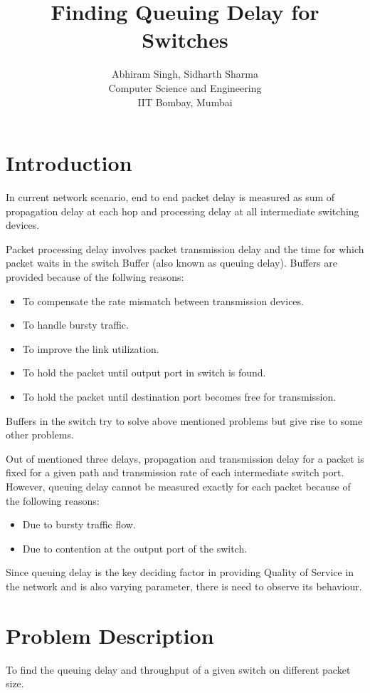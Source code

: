 \documentclass[twocolumn,10pt]{article}
\date{}
\begin{document}
\title{\textbf{Finding Queuing Delay for Switches}}
\author{Abhiram Singh, Sidharth Sharma \\Computer Science and Engineering\\ IIT Bombay, Mumbai}
\maketitle

\section{Introduction}
In current network scenario, end to end packet delay is measured as sum of propagation delay at each hop and processing delay at all intermediate switching devices.

Packet processing delay involves packet transmission delay and the time for which packet waits in the switch Buffer (also known as queuing delay).
Buffers are provided because of the follwing reasons:
\begin{itemize}
\item To compensate the rate mismatch between transmission devices.
\item To handle bursty traffic.
\item To improve the link utilization.
\item To hold the packet until output port in switch is found.
\item To hold the packet until destination port becomes free for transmission.
\end{itemize}
Buffers in the switch try to solve above mentioned problems but give rise to some other problems.

Out of mentioned three delays, propagation and transmission delay for a packet is fixed for a given path and transmission rate of each intermediate switch port.
However, queuing delay cannot be measured exactly for each packet because of the following reasons:
\begin{itemize}
\item Due to bursty traffic flow.
\item Due to contention at the output port of the switch.
\end{itemize}
Since queuing delay is the key deciding factor in providing Quality of Service in the network and is also varying parameter, there is need to observe its behaviour.

\section{Problem Description}
To find the queuing delay and throughput of a given switch on different packet size. 
\end{document}
